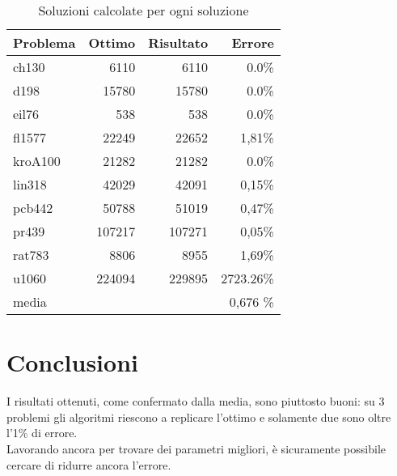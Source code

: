 \documentclass[a4paper,11pt,oneside]{DTI}
\begin{document}
\begin{table}[htb]
  \caption{Soluzioni calcolate per ogni soluzione}
  \label{tab_risultati}
  \centering
\begin{tabular}{lrrr}
  \toprule
  Problema		&	Ottimo		&	Risultato	&	Errore		\\
  \midrule
  ch130			&	6110		&	6110		&	0.0\%	  \\
  d198			&	15780		&	15780		&	0.0\%	  \\
  eil76			&	538		    &	538		   &	0.0\%	  \\
  fl1577		&	22249		&	22652		&	1,81\% \\
  kroA100		&	21282		&	21282		&	0.0\%	  \\
  lin318		&	42029		&	42091		&	0,15\% \\	
  pcb442		&	50788		&	51019		&	0,47\% \\
  pr439			&	107217		&	107271		&	0,05\% \\
  rat783		&	8806		&	8955		&	1,69\% \\
  u1060			&	224094		&	229895		&	2723.26\% \\
  \midrule
  media			&			&			&	0,676 \% 			\\
  \bottomrule
\end{tabular}
\end{table}




%
\chapter*{Conclusioni}
I risultati ottenuti, come confermato dalla media, sono piuttosto buoni: su 3 problemi gli algoritmi riescono a replicare l'ottimo e solamente due sono oltre l'1\% di errore.\\
Lavorando ancora per trovare dei parametri migliori, è sicuramente possibile cercare di ridurre ancora l'errore.\\
\end{document}
